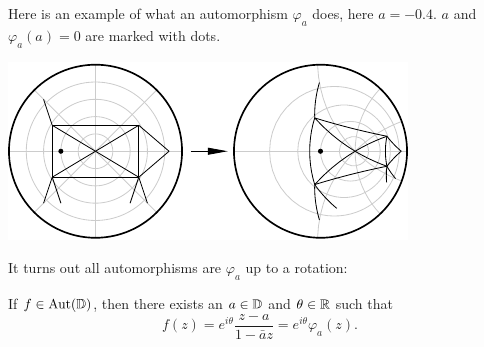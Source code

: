 \documentclass[10pt,aspectratio=169]{beamer}
\begin{document}
\begin{frame}
Here is an example of what an automorphism $\varphi_a$ does, here $a=-0.4$.
$a$ and $\varphi_a(a)=0$ are marked with dots.

\begin{center}
\includegraphics{../figures/varphiplot}
\end{center}

\pause

It turns out all automorphisms are $\varphi_a$ up to a rotation:

\pause

\begin{proposition}
If $f \in \operatorname{Aut}({\mathbb{D}})$, then there exists an $a \in {\mathbb{D}}$
and $\theta \in {\mathbb{R}}$ such that
\begin{equation*}
f(z) = e^{i\theta} \frac{z-a}{1-\bar{a}z} = e^{i\theta} \varphi_a(z).
\end{equation*}
\end{proposition}

\end{frame}
\end{document}
